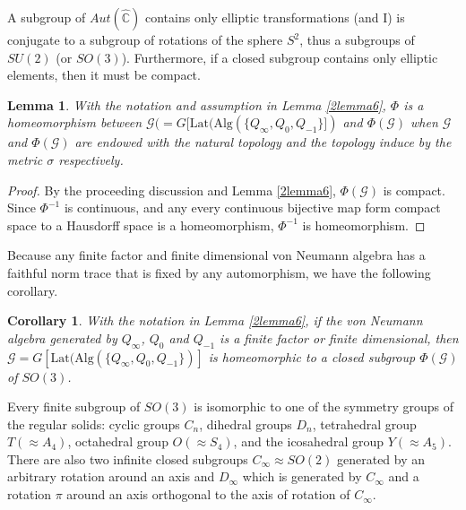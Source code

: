 \documentclass{amsart}
\newcommand{\Lat}{\mathrm{Lat}}
\newcommand{\Alg}{\mathrm{Alg}}
\newcommand{\C}{\mathbb C} %
\newtheorem{corollary}{Corollary}[section]
\newtheorem{lemma}{Lemma}[section]
\begin{document}
A subgroup of $Aut(\widehat{\C})$ contains only elliptic transformations (and I) is conjugate to a subgroup of rotations of the sphere $S^2$, thus a subgroups of $SU(2)$ (or $SO(3)$).
Furthermore, if a closed subgroup contains only elliptic elements, then it must be compact. 

\begin{lemma}
With the notation and assumption in Lemma \ref{2lemma6},  
$\Phi$ is a homeomorphism between $\mathcal{G} (= G[\Lat(\Alg( \{ Q_{\infty},  Q_{0}, Q_{-1} \}])$ and $\Phi(\mathcal{G})$ when $\mathcal{G}$ and $\Phi(\mathcal{G})$ are endowed with the natural topology and 
the topology induce by the metric $\sigma$ respectively. 
\end{lemma}
\begin{proof}
By the proceeding discussion and Lemma \ref{2lemma6}, $\Phi(\mathcal{G})$ is compact. Since $\Phi^{-1}$ is continuous,
and any every continuous bijective map form compact space to a Hausdorff space is a homeomorphism, $\Phi^{-1}$ is homeomorphism.
\end{proof}


Because any finite factor and finite dimensional von Neumann algebra has a faithful 
norm trace that is fixed by any automorphism, we have the following corollary.

\begin{corollary}\label{2cor2}
With the notation in Lemma \ref{2lemma6}, if the von Neumann algebra generated by $Q_{\infty}$, $Q_{0}$ and $Q_{-1}$ is a finite factor or finite dimensional, then 
$\mathcal{G} = G[\Lat(\Alg( \{ Q_{\infty},  Q_{0}, Q_{-1} \})]$ is homeomorphic to a closed subgroup $\Phi(\mathcal{G})$ of $SO(3)$.
\end{corollary} 

Every finite subgroup of $SO(3)$ is isomorphic to one of the symmetry groups of the regular solids: cyclic groups $C_n$, dihedral groups $D_n$, 
tetrahedral group $T ( \approx A_4) $, octahedral group $O (\approx S_4)$, and the icosahedral group $Y (\approx A_5)$. 
There are also two infinite closed subgroups $C_{\infty} \approx SO(2)$ generated by an arbitrary
rotation around an axis and $D_{\infty}$ which is generated by $C_{\infty}$ and a rotation $\pi$ around an axis orthogonal to
the axis of rotation of $C_{\infty}$.
\end{document}
